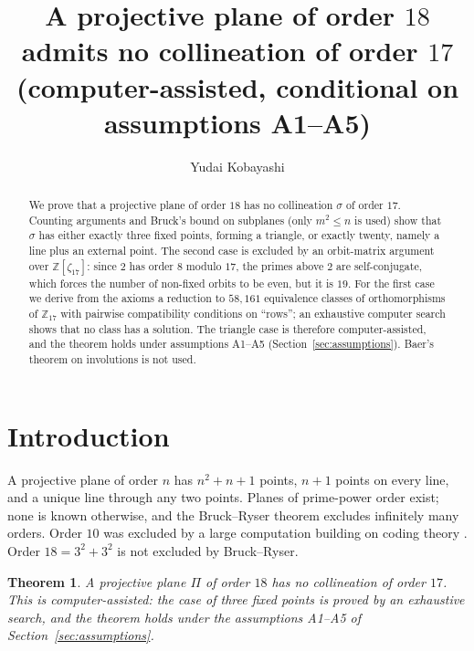 \documentclass[11pt,a4paper]{article}
\title{A projective plane of order $18$ admits no collineation of order $17$\\(computer-assisted, conditional on assumptions A1--A5)}
\author{Yudai Kobayashi}
\date{}
\newtheorem{theorem}{Theorem}[section]
\theoremstyle{definition}
\newcommand{\ZZ}{\mathbb{Z}}
\begin{document}
\maketitle

\begin{abstract}
We prove that a projective plane of order $18$ has no collineation $\sigma$ of order $17$.
Counting arguments and Bruck's bound on subplanes (only $m^2\le n$ is used) show that $\sigma$ has either exactly three fixed points, forming a triangle, or exactly twenty, namely a line plus an external point.
The second case is excluded by an orbit-matrix argument over $\ZZ[\zeta_{17}]$: since $2$ has order $8$ modulo $17$, the primes above $2$ are self-conjugate, which forces the number of non-fixed orbits to be even, but it is $19$.
For the first case we derive from the axioms a reduction to $58{,}161$ equivalence classes of orthomorphisms of $\ZZ_{17}$ with pairwise compatibility conditions on ``rows''; an exhaustive computer search shows that no class has a solution.
The triangle case is therefore computer-assisted, and the theorem holds under assumptions A1--A5 (Section~\ref{sec:assumptions}).
Baer's theorem on involutions is not used.
\end{abstract}

\section{Introduction}\label{sec:intro}

A projective plane of order $n$ has $n^2+n+1$ points, $n+1$ points on every line, and a unique line through any two points.
Planes of prime-power order exist; none is known otherwise, and the Bruck--Ryser theorem \cite{BruckRyser49} excludes infinitely many orders. Order $10$ was excluded by a large computation \cite{LTS89} building on coding theory \cite{MST73}. Order $18=3^2+3^2$ is not excluded by Bruck--Ryser.

\begin{theorem}\label{thm:main}
A projective plane $\Pi$ of order $18$ has no collineation of order $17$.
This is computer-assisted: the case of three fixed points is proved by an exhaustive search, and the theorem holds under the assumptions A1--A5 of Section~\ref{sec:assumptions}.
\end{theorem}
\end{document}
